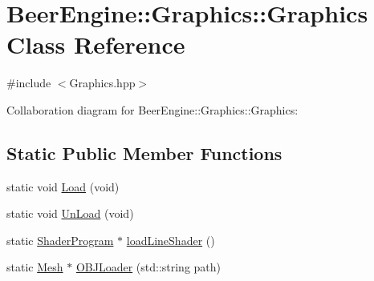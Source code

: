 \hypertarget{class_beer_engine_1_1_graphics_1_1_graphics}{}\section{Beer\+Engine\+:\+:Graphics\+:\+:Graphics Class Reference}
\label{class_beer_engine_1_1_graphics_1_1_graphics}


{\ttfamily \#include $<$Graphics.\+hpp$>$}



Collaboration diagram for Beer\+Engine\+:\+:Graphics\+:\+:Graphics\+:
\subsection*{Static Public Member Functions}
\begin{DoxyCompactItemize}
\item 
static void \mbox{\hyperlink{class_beer_engine_1_1_graphics_1_1_graphics_a87ad2f3a98b4fa5fd453589f7f023701}{Load}} (void)
\item 
static void \mbox{\hyperlink{class_beer_engine_1_1_graphics_1_1_graphics_ab42d214b5a3f69614ad5b9c30d506619}{Un\+Load}} (void)
\item 
static \mbox{\hyperlink{class_beer_engine_1_1_graphics_1_1_shader_program}{Shader\+Program}} $\ast$ \mbox{\hyperlink{class_beer_engine_1_1_graphics_1_1_graphics_a385cbcbf514ef7c22cb4a0ed6f577908}{load\+Line\+Shader}} ()
\item 
static \mbox{\hyperlink{class_beer_engine_1_1_graphics_1_1_mesh}{Mesh}} $\ast$ \mbox{\hyperlink{class_beer_engine_1_1_graphics_1_1_graphics_a0b9081ae33ab8eb0a166c49f70d907ef}{O\+B\+J\+Loader}} (std\+::string path)
\end{DoxyCompactItemize}
